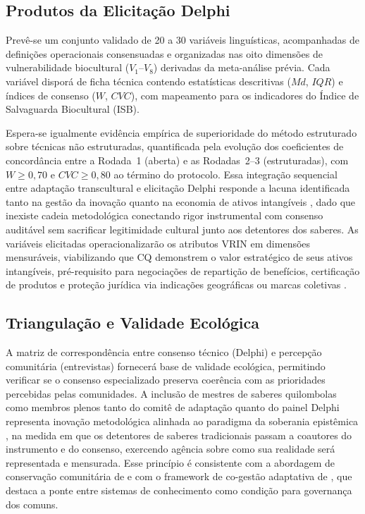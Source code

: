 \subsection{Produtos da Elicitação Delphi}

Prevê-se um conjunto validado de 20 a 30 variáveis linguísticas, acompanhadas de definições operacionais consensuadas e organizadas nas oito dimensões de vulnerabilidade biocultural ($V_1$--$V_8$) derivadas da meta-análise prévia. Cada variável disporá de ficha técnica contendo estatísticas descritivas ($Md$, $IQR$) e índices de consenso ($W$, $CVC$), com mapeamento para os indicadores do Índice de Salvaguarda Biocultural (ISB).

Espera-se igualmente evidência empírica de superioridade do método estruturado sobre técnicas não estruturadas, quantificada pela evolução dos coeficientes de concordância entre a Rodada~1 (aberta) e as Rodadas~2--3 (estruturadas), com $W \geq 0,70$ e $CVC \geq 0,80$ ao término do protocolo. Essa integração sequencial entre adaptação transcultural e elicitação Delphi responde a lacuna identificada tanto na gestão da inovação \cite{Tidd2005} quanto na economia de ativos intangíveis \cite{Lev2001}, dado que inexiste cadeia metodológica conectando rigor instrumental com consenso auditável sem sacrificar legitimidade cultural junto aos detentores dos saberes. As variáveis elicitadas operacionalizarão os atributos VRIN em dimensões mensuráveis, viabilizando que CQ demonstrem o valor estratégico de seus ativos intangíveis, pré-requisito para negociações de repartição de benefícios, certificação de produtos e proteção jurídica via indicações geográficas ou marcas coletivas \cite{Belletti2015}.

\subsection{Triangulação e Validade Ecológica}

A matriz de correspondência entre consenso técnico (Delphi) e percepção comunitária (entrevistas) fornecerá base de validade ecológica, permitindo verificar se o consenso especializado preserva coerência com as prioridades percebidas pelas comunidades. A inclusão de mestres de saberes quilombolas como membros plenos tanto do comitê de adaptação quanto do painel Delphi representa inovação metodológica alinhada ao paradigma da soberania epistêmica \cite{Santos2007}, na medida em que os detentores de saberes tradicionais passam a coautores do instrumento e do consenso, exercendo agência sobre como sua realidade será representada e mensurada. Esse princípio é consistente com a abordagem de conservação comunitária de  e com o framework de co-gestão adaptativa de , que destaca a ponte entre sistemas de conhecimento como condição para governança dos comuns.

